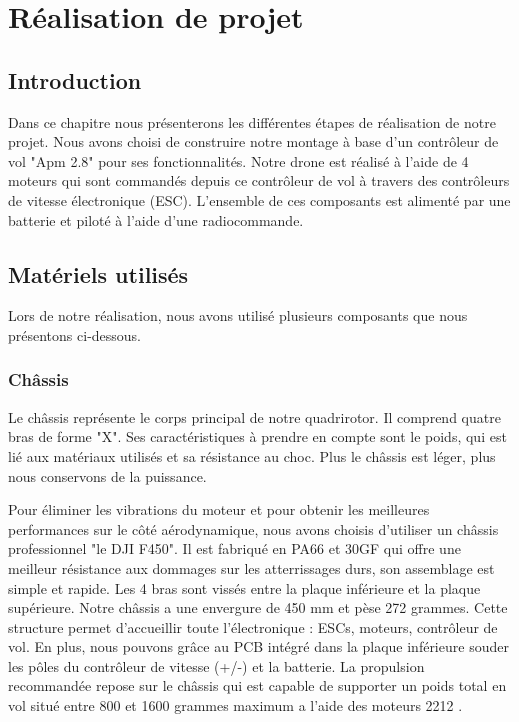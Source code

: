 

	

\chapter{Réalisation de projet}
\newpage
	\section*{Introduction}
	
	Dans ce chapitre nous présenterons les différentes étapes de réalisation de notre projet. Nous avons choisi de construire notre montage à base d'un contrôleur de vol "Apm 2.8" pour ses fonctionnalités. Notre drone est réalisé à l'aide de 4 moteurs qui sont commandés depuis ce contrôleur de vol  à travers des contrôleurs de vitesse électronique (ESC). L'ensemble de ces composants  est alimenté par une batterie et piloté à l'aide d’une radiocommande.
	\section{Matériels utilisés}
	Lors de notre réalisation, nous avons utilisé plusieurs composants que nous présentons ci-dessous.
	\subsection{Châssis}
	Le châssis représente le corps principal de notre quadrirotor. Il comprend quatre bras de forme "X". Ses caractéristiques à prendre en compte sont le poids, qui est lié aux matériaux utilisés et sa résistance au choc. Plus le châssis est léger, plus nous conservons de la puissance.
	
	Pour éliminer les vibrations du moteur et pour obtenir les meilleures performances sur le côté aérodynamique, nous avons choisis d’utiliser un châssis professionnel "le DJI F450". Il est fabriqué en PA66 et 30GF qui offre une meilleur résistance aux dommages sur les atterrissages durs\cite{smartcube}, son assemblage est simple et rapide. Les 4 bras sont vissés entre la plaque inférieure et la plaque supérieure. Notre châssis a une envergure de 450 mm et pèse 272 grammes.
	Cette structure permet d'accueillir toute l'électronique : ESCs, moteurs, contrôleur de vol. En plus, nous pouvons grâce au PCB intégré dans la plaque inférieure souder les pôles du contrôleur de vitesse (+/-) et la batterie. La propulsion recommandée repose sur le châssis qui est capable de supporter un poids total en vol situé entre 800 et 1600 grammes maximum a l'aide des moteurs 2212 \cite{studiosport}.
	
